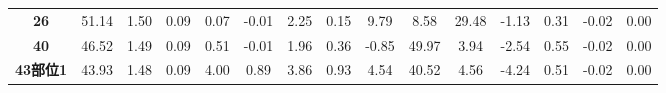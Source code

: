 \documentclass[withoutpreface,bwprint]{cumcmthesis} %
\begin{document}
\begin{appendices}
\begin{table}[!h]
\begin{tabular}{@{}ccccccccccccccc@{}}
			\textbf{26}      & 51.14                                                          & 1.50                                                          & 0.09                                                         & 0.07                                                         & -0.01                                                        & 2.25                                                           & 0.15                                                           & 9.79                                                         & 8.58                                                         & 29.48                                                        & -1.13                                                           & 0.31                                                         & -0.02                                                         & 0.00                                                          \\
			\textbf{40}      & 46.52                                                          & 1.49                                                          & 0.09                                                         & 0.51                                                         & -0.01                                                        & 1.96                                                           & 0.36                                                           & -0.85                                                        & 49.97                                                        & 3.94                                                         & -2.54                                                           & 0.55                                                         & -0.02                                                         & 0.00                                                          \\
			\textbf{43部位1}   & 43.93                                                          & 1.48                                                          & 0.09                                                         & 4.00                                                         & 0.89                                                         & 3.86                                                           & 0.93                                                           & 4.54                                                         & 40.52                                                        & 4.56                                                         & -4.24                                                           & 0.51                                                         & -0.02                                                         & 0.00                                                          \\

\end{tabular}
\end{table}
\end{appendices}
\end{document}
